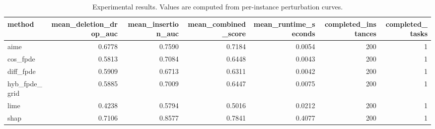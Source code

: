 \begin{table}[t]
\caption{Experimental results. Values are computed from per-instance perturbation curves.}
\label{tab:main_results_computed}
\centering
\begin{tabular}{lrrrrrr}
\toprule
method & mean\_deletion\_drop\_auc & mean\_insertion\_auc & mean\_combined\_score & mean\_runtime\_seconds & completed\_instances & completed\_tasks \\
\midrule
aime & 0.6778 & 0.7590 & 0.7184 & 0.0054 & 200 & 1 \\
cos\_fpde & 0.5813 & 0.7084 & 0.6448 & 0.0043 & 200 & 1 \\
diff\_fpde & 0.5909 & 0.6713 & 0.6311 & 0.0042 & 200 & 1 \\
hyb\_fpde\_grid & 0.5885 & 0.7009 & 0.6447 & 0.0075 & 200 & 1 \\
lime & 0.4238 & 0.5794 & 0.5016 & 0.0212 & 200 & 1 \\
shap & 0.7106 & 0.8577 & 0.7841 & 0.4077 & 200 & 1 \\
\bottomrule
\end{tabular}

\end{table}
